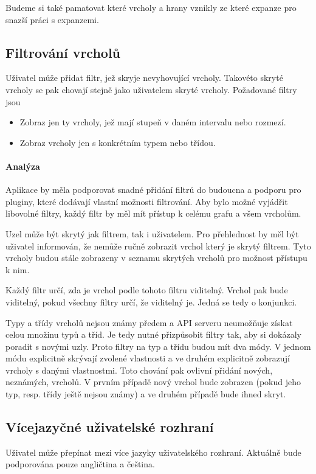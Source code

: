 Budeme si také pamatovat které vrcholy a hrany vznikly ze které expanze pro snazší práci s expanzemi.

\subsection*{Filtrování vrcholů}
Uživatel může přidat filtr, jež skryje nevyhovující vrcholy. Takovéto skryté vrcholy se pak chovají stejně jako uživatelem skryté vrcholy. Požadované filtry jsou
\begin{itemize}
    \item Zobraz jen ty vrcholy, jež mají stupeň v daném intervalu nebo rozmezí.
    \item Zobraz vrcholy jen s konkrétním typem nebo třídou.
\end{itemize}

\paragraph{Analýza} Aplikace by měla podporovat snadné přidání filtrů do budoucna a podporu pro pluginy, které dodávají vlastní možnosti filtrování. Aby bylo možné vyjádřit libovolné filtry, každý filtr by měl mít přístup k celému grafu a všem vrcholům.

Uzel může být skrytý jak filtrem, tak i uživatelem. Pro přehlednost by měl být uživatel informován, že nemůže ručně zobrazit vrchol který je skrytý filtrem. Tyto vrcholy budou stále zobrazeny v seznamu skrytých vrcholů pro možnost přístupu k nim.

Každý filtr určí, zda je vrchol podle tohoto filtru viditelný. Vrchol pak bude viditelný, pokud všechny filtry určí, že viditelný je. Jedná se tedy o konjunkci.

Typy a třídy vrcholů nejsou známy předem a API serveru neumožňuje získat celou množinu typů a tříd. Je tedy nutné přizpůsobit filtry tak, aby si dokázaly poradit s novými uzly. Proto filtry na typ a třídu budou mít dva módy. V jednom módu explicitně skrývají zvolené vlastnosti a ve druhém explicitně zobrazují vrcholy s danými vlastnostmi. Toto chování pak ovlivní přidání nových, neznámých, vrcholů. V prvním případě nový vrchol bude zobrazen (pokud jeho typ, resp. třídy ještě nejsou známy) a ve druhém případě bude ihned skryt.

\subsection*{Vícejazyčné uživatelské rozhraní}
Uživatel může přepínat mezi více jazyky uživatelského rozhraní. Aktuálně bude podporována pouze angličtina a čeština.

